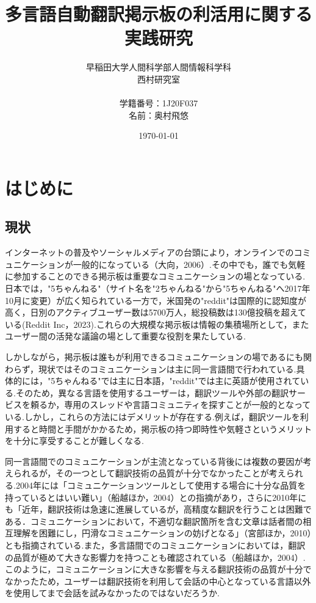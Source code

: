 \documentclass[b5paper,12pt]{jsreport}
\title{多言語自動翻訳掲示板の利活用に関する実践研究}
\author{早稲田大学人間科学部人間情報科学科\\
西村研究室\\
\\
学籍番号：1J20F037\\
名前：奥村飛悠}
\date{\today}
\begin{document}
\maketitle
\tableofcontents

\chapter{はじめに}

\section{現状}

インターネットの普及やソーシャルメディアの台頭により，オンラインでのコミュニケーションが一般的になっている（大向，2006）.その中でも，誰でも気軽に参加することのできる掲示板は重要なコミュニケーションの場となっている.日本では，"5ちゃんねる"（サイト名を"2ちゃんねる"から"5ちゃんねる"へ2017年10月に変更）が広く知られている一方で，米国発の"reddit"は国際的に認知度が高く，日別のアクティブユーザー数は5700万人，総投稿数は130億投稿を超えている(Reddit Inc，2023).これらの大規模な掲示板は情報の集積場所として，またユーザー間の活発な議論の場として重要な役割を果たしている.

しかしながら，掲示板は誰もが利用できるコミュニケーションの場であるにも関わらず，現状ではそのコミュニケーションは主に同一言語間で行われている.具体的には，"5ちゃんねる"では主に日本語，"reddit"では主に英語が使用されている.そのため，異なる言語を使用するユーザーは，翻訳ツールや外部の翻訳サービスを頼るか，専用のスレッドや言語コミュニティを探すことが一般的となっている.しかし，これらの方法にはデメリットが存在する.例えば，翻訳ツールを利用すると時間と手間がかかるため，掲示板の持つ即時性や気軽さというメリットを十分に享受することが難しくなる.

同一言語間でのコミュニケーションが主流となっている背後には複数の要因が考えられるが，その一つとして翻訳技術の品質が十分でなかったことが考えられる.2004年には「コミュニケーションツールとして使用する場合に十分な品質を持っているとはいい難い」（船越ほか，2004）との指摘があり，さらに2010年にも「近年，翻訳技術は急速に進展しているが，高精度な翻訳を行うことは困難である．コミュニケーションにおいて，不適切な翻訳箇所を含む文章は話者間の相互理解を困難にし，円滑なコミュニケーションの妨げとなる」（宮部ほか，2010）とも指摘されている.また，多言語間でのコミュニケーションにおいては，翻訳の品質が極めて大きな影響力を持つことも確認されている（船越ほか，2004）.このように，コミュニケーションに大きな影響を与える翻訳技術の品質が十分でなかったため，ユーザーは翻訳技術を利用して会話の中心となっている言語以外を使用してまで会話を試みなかったのではないだろうか.
\end{document}
